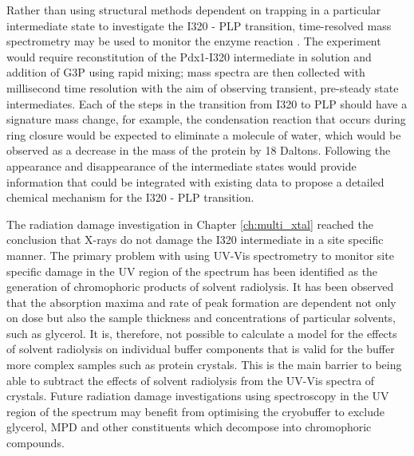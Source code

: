 Rather than using structural methods dependent on trapping in a particular intermediate state to investigate the I320 - PLP transition, time-resolved mass spectrometry may be used to monitor the enzyme reaction \cite{Wilson2004}. The experiment would require reconstitution of the Pdx1-I320 intermediate in solution and addition of G3P using rapid mixing; mass spectra are then collected with millisecond time resolution with the aim of observing transient, pre-steady state intermediates. Each of the steps in the transition from I320 to PLP should have a signature mass change, for example, the condensation reaction that occurs during ring closure would be expected to eliminate a molecule of water, which would be observed as a decrease in the mass of the protein by 18 Daltons. Following the appearance and disappearance of the intermediate states would provide information that could be integrated with existing data to propose a detailed chemical mechanism for the I320 - PLP transition.  


The radiation damage investigation in Chapter \ref{ch:multi_xtal} reached the conclusion that X-rays do not damage the I320 intermediate in a site specific manner. The primary problem with using UV-Vis spectrometry to monitor site specific damage in the UV region of the spectrum has been identified as the generation of chromophoric products of solvent radiolysis. It has been observed that the absorption maxima and rate of peak formation are dependent not only on dose but also the sample thickness and concentrations of particular solvents, such as glycerol. It is, therefore, not possible to calculate a model for the effects of solvent radiolysis on individual buffer components that is valid for the buffer more complex samples such as protein crystals. This is the main barrier to being able to subtract the effects of solvent radiolysis from the UV-Vis spectra of crystals. Future radiation damage investigations using spectroscopy in the UV region of the spectrum may benefit from optimising the cryobuffer to exclude glycerol, MPD and other constituents which decompose into chromophoric compounds.      





   